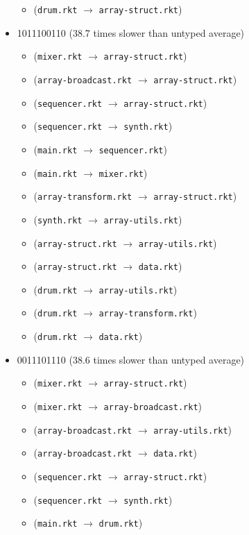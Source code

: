 \documentclass{article}
\newcommand{\mono}[1]{\texttt{#1}}
\begin{document}
\begin{itemize}
\begin{itemize}
  \item (\mono{drum.rkt} $\rightarrow$ \mono{array-struct.rkt})
  \end{itemize}
\item 1011100110 (38.7 times slower than untyped average)
  \begin{itemize}
  \item (\mono{mixer.rkt} $\rightarrow$ \mono{array-struct.rkt})
  \item (\mono{array-broadcast.rkt} $\rightarrow$ \mono{array-struct.rkt})
  \item (\mono{sequencer.rkt} $\rightarrow$ \mono{array-struct.rkt})
  \item (\mono{sequencer.rkt} $\rightarrow$ \mono{synth.rkt})
  \item (\mono{main.rkt} $\rightarrow$ \mono{sequencer.rkt})
  \item (\mono{main.rkt} $\rightarrow$ \mono{mixer.rkt})
  \item (\mono{array-transform.rkt} $\rightarrow$ \mono{array-struct.rkt})
  \item (\mono{synth.rkt} $\rightarrow$ \mono{array-utils.rkt})
  \item (\mono{array-struct.rkt} $\rightarrow$ \mono{array-utils.rkt})
  \item (\mono{array-struct.rkt} $\rightarrow$ \mono{data.rkt})
  \item (\mono{drum.rkt} $\rightarrow$ \mono{array-utils.rkt})
  \item (\mono{drum.rkt} $\rightarrow$ \mono{array-transform.rkt})
  \item (\mono{drum.rkt} $\rightarrow$ \mono{data.rkt})
  \end{itemize}
\item 0011101110 (38.6 times slower than untyped average)
  \begin{itemize}
  \item (\mono{mixer.rkt} $\rightarrow$ \mono{array-struct.rkt})
  \item (\mono{mixer.rkt} $\rightarrow$ \mono{array-broadcast.rkt})
  \item (\mono{array-broadcast.rkt} $\rightarrow$ \mono{array-utils.rkt})
  \item (\mono{array-broadcast.rkt} $\rightarrow$ \mono{data.rkt})
  \item (\mono{sequencer.rkt} $\rightarrow$ \mono{array-struct.rkt})
  \item (\mono{sequencer.rkt} $\rightarrow$ \mono{synth.rkt})
  \item (\mono{main.rkt} $\rightarrow$ \mono{drum.rkt})

\end{itemize}
\end{itemize}
\end{document}
